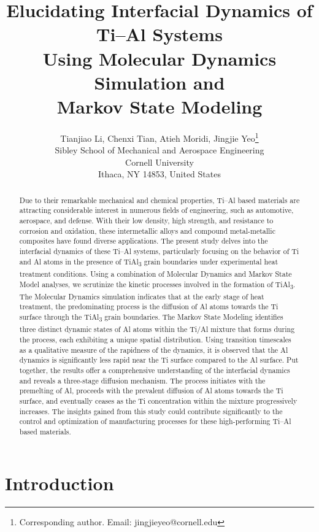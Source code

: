 \documentclass{article}
\title{Elucidating Interfacial Dynamics of Ti--Al Systems \\ Using Molecular Dynamics Simulation and \\ Markov State Modeling
}
\author{
  Tianjiao Li, Chenxi Tian, Atieh Moridi, Jingjie Yeo\thanks{Corresponding author. Email: jingjieyeo@cornell.edu} \\
  Sibley School of Mechanical and Aerospace Engineering \\
  Cornell University \\ 
  Ithaca, NY 14853, United States\\
}
\begin{document}
\maketitle

\begin{abstract}
Due to their remarkable mechanical and chemical properties, Ti--Al based materials are attracting considerable interest in numerous fields of engineering, such as automotive, aerospace, and defense. With their low density, high strength, and resistance to corrosion and oxidation, these intermetallic alloys and compound metal-metallic composites have found diverse applications. The present study delves into the interfacial dynamics of these Ti--Al systems, particularly focusing on the behavior of Ti and Al atoms in the presence of TiAl\textsubscript{3} grain boundaries under experimental heat treatment conditions. Using a combination of Molecular Dynamics and Markov State Model analyses, we scrutinize the kinetic processes involved in the formation of TiAl\textsubscript{3}. The Molecular Dynamics simulation indicates that at the early stage of heat treatment, the predominating process is the diffusion of Al atoms towards the Ti surface through the TiAl\textsubscript{3} grain boundaries. The Markov State Modeling identifies three distinct dynamic states of Al atoms within the Ti/Al mixture that forms during the process, each exhibiting a unique spatial distribution. Using transition timescales as a qualitative measure of the rapidness of the dynamics, it is observed that the Al dynamics is significantly less rapid near the Ti surface compared to the Al surface. Put together, the results offer a comprehensive understanding of the interfacial dynamics and reveals a three-stage diffusion mechanism. The process initiates with the premelting of Al, proceeds with the prevalent diffusion of Al atoms towards the Ti surface, and eventually ceases as the Ti concentration within the mixture progressively increases. The insights gained from this study could contribute significantly to the control and optimization of manufacturing processes for these high-performing Ti--Al based materials.
\end{abstract}



\section{Introduction}

\end{document}
